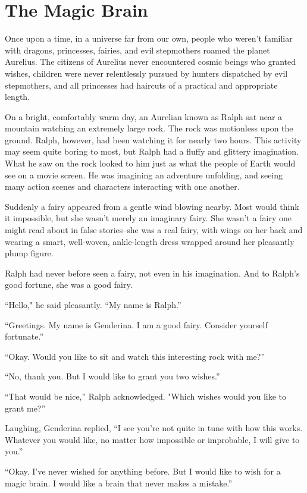 \chapter{The Magic Brain}

Once upon a time, in a universe far from our own, people who weren't familiar with dragons, princesses, fairies, and evil stepmothers roamed the planet Aurelius. The citizens of Aurelius never encountered cosmic beings who granted wishes, children were never relentlessly pursued by hunters dispatched by evil stepmothers, and all princesses had haircuts of a practical and appropriate length.

On a bright, comfortably warm day, an Aurelian known as Ralph sat near a mountain watching an extremely large rock. The rock was motionless upon the ground. Ralph, however, had been watching it for nearly two hours. This activity may seem quite boring to most, but Ralph had a fluffy and glittery imagination. What he saw on the rock looked to him just as what the people of Earth would see on a movie screen. He was imagining an adventure unfolding, and seeing many action scenes and characters interacting with one another.

Suddenly a fairy appeared from a gentle wind blowing nearby. Most would think it impossible, but she wasn't merely an imaginary fairy. She wasn't a fairy one might read about in false stories--she was a real fairy, with wings on her back and wearing a smart, well-woven, ankle-length dress wrapped around her pleasantly plump figure.

Ralph had never before seen a fairy, not even in his imagination. And to Ralph's good fortune, she was a good fairy.

“Hello," he said pleasantly. “My name is Ralph.”

“Greetings. My name is Genderina. I am a good fairy. Consider yourself fortunate.”

“Okay. Would you like to sit and watch this interesting rock with me?”

“No, thank you. But I would like to grant you two wishes.”

“That would be nice,” Ralph acknowledged. "Which wishes would you like to grant me?”

Laughing, Genderina replied, “I see you're not quite in tune with how this works. Whatever you would like, no matter how impossible or improbable, I will give to you.”

“Okay. I've never wished for anything before. But I would like to wish for a magic brain. I would like a brain that never makes a mistake.”

